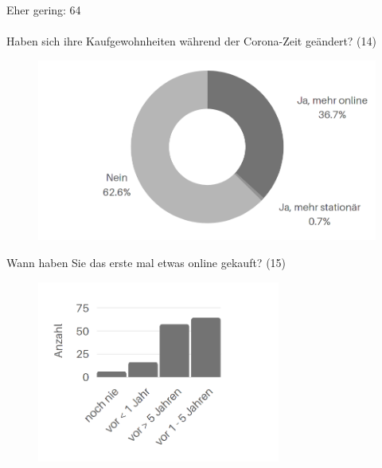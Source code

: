 Eher gering: 64\\\\
\fi
\newpage\noindent Haben sich ihre Kaufgewohnheiten während der Corona-Zeit geändert? (14)\vfill

\begin{figure}[H]
    \begin{center}
        \includegraphics[width=12cm]{media/schuelerumfrage/14.png}
    \end{center}
\end{figure}

\vfill\vfill
\noindent Wann haben Sie das erste mal etwas online gekauft? (15)\vfill

\begin{figure}[H]
    \begin{center}
        \includegraphics[width=8cm]{media/schuelerumfrage/15.png}
    \end{center}
\end{figure} 
\vfill

\newpage









